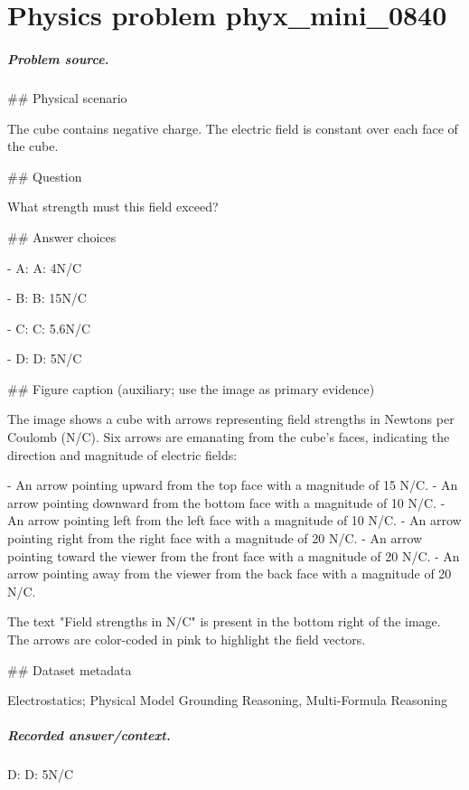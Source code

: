 
\chapter{Physics problem phyx\_mini\_0840}
\label{ch:PhyXMiniProblems_problem_phyx_mini_0840}

\paragraph{Problem source.}
\#\# Physical scenario

The cube contains negative charge. The electric field is constant over each face of the cube.

\#\# Question

What strength must this field exceed?

\#\# Answer choices

- A: A: 4N/C

- B: B: 15N/C

- C: C: 5.6N/C

- D: D: 5N/C

\#\# Figure caption (auxiliary; use the image as primary evidence)

The image shows a cube with arrows representing field strengths in Newtons per Coulomb (N/C). Six arrows are emanating from the cube’s faces, indicating the direction and magnitude of electric fields:

- An arrow pointing upward from the top face with a magnitude of 15 N/C.
- An arrow pointing downward from the bottom face with a magnitude of 10 N/C.
- An arrow pointing left from the left face with a magnitude of 10 N/C.
- An arrow pointing right from the right face with a magnitude of 20 N/C.
- An arrow pointing toward the viewer from the front face with a magnitude of 20 N/C.
- An arrow pointing away from the viewer from the back face with a magnitude of 20 N/C.

The text "Field strengths in N/C" is present in the bottom right of the image. The arrows are color-coded in pink to highlight the field vectors.

\#\# Dataset metadata

Electrostatics; Physical Model Grounding Reasoning, Multi-Formula Reasoning

\paragraph{Recorded answer/context.}
D: D: 5N/C

